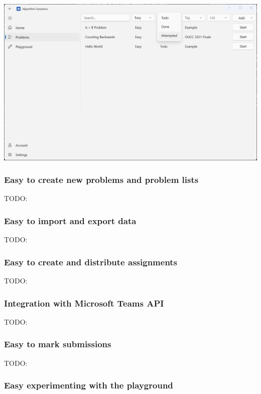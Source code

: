 \documentclass[a4paper]{report}
\begin{document}
\includegraphics[width=\textwidth, height=\textheight, keepaspectratio]{ProblemsPage-Final}

\subsubsection{Easy to create new problems and problem lists}

TODO:

\subsubsection{Easy to import and export data}

TODO:

\subsubsection{Easy to create and distribute assignments}

TODO:

\subsubsection{Integration with Microsoft Teams API}

TODO:

\subsubsection{Easy to mark submissions}

TODO:

\subsubsection{Easy experimenting with the playground}
\end{document}
